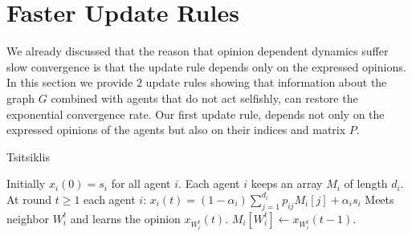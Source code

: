 \section{Faster Update Rules}\label{s:graph_aware}

We already discussed that the reason that opinion dependent dynamics suffer slow
convergence is that the update rule depends only on the expressed opinions.
In this section we provide $2$ update rules showing that information about the
graph $G$ combined with agents that do not act selfishly,
can restore the exponential convergence rate.
Our first update rule, depends not only on the expressed opinions of the
agents but also on their indices and matrix $P$.
\begin{algorithm}
  \caption{Tsitsiklis}
  \label{alg:tsitsiklis}
  \begin{algorithmic}[1]
    \STATE Initially $x_i(0) = s_i$ for all agent $i$.
    \STATE Each agent $i$ keeps an array $M_i$ of length $d_i$.
    \STATE At round $t\geq 1$ each agent $i$:
    \bindent
    \STATE $x_i(t) = (1-\alpha_i)\sum_{j=1}^{d_i} p_{ij} M_i[j] + \alpha_is_i$
    \STATE Meets neighbor $W_i^t$ and learns the opinion $x_{W_i^t}(t)$.
    \STATE $M_i[W_i^t] \gets x_{W_i^t}(t-1)$.
    
    \eindent
\end{algorithmic}
\end{algorithm}

